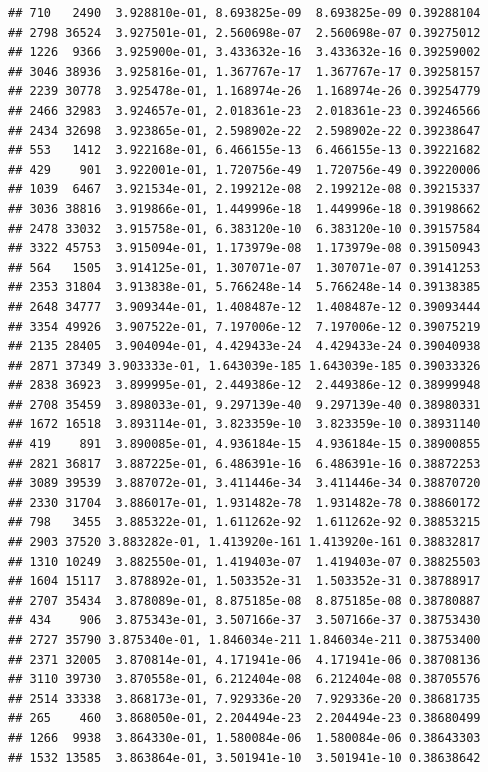 \documentclass[
]{article}
\begin{document}
\begin{verbatim}
## 710   2490  3.928810e-01, 8.693825e-09  8.693825e-09 0.39288104
## 2798 36524  3.927501e-01, 2.560698e-07  2.560698e-07 0.39275012
## 1226  9366  3.925900e-01, 3.433632e-16  3.433632e-16 0.39259002
## 3046 38936  3.925816e-01, 1.367767e-17  1.367767e-17 0.39258157
## 2239 30778  3.925478e-01, 1.168974e-26  1.168974e-26 0.39254779
## 2466 32983  3.924657e-01, 2.018361e-23  2.018361e-23 0.39246566
## 2434 32698  3.923865e-01, 2.598902e-22  2.598902e-22 0.39238647
## 553   1412  3.922168e-01, 6.466155e-13  6.466155e-13 0.39221682
## 429    901  3.922001e-01, 1.720756e-49  1.720756e-49 0.39220006
## 1039  6467  3.921534e-01, 2.199212e-08  2.199212e-08 0.39215337
## 3036 38816  3.919866e-01, 1.449996e-18  1.449996e-18 0.39198662
## 2478 33032  3.915758e-01, 6.383120e-10  6.383120e-10 0.39157584
## 3322 45753  3.915094e-01, 1.173979e-08  1.173979e-08 0.39150943
## 564   1505  3.914125e-01, 1.307071e-07  1.307071e-07 0.39141253
## 2353 31804  3.913838e-01, 5.766248e-14  5.766248e-14 0.39138385
## 2648 34777  3.909344e-01, 1.408487e-12  1.408487e-12 0.39093444
## 3354 49926  3.907522e-01, 7.197006e-12  7.197006e-12 0.39075219
## 2135 28405  3.904094e-01, 4.429433e-24  4.429433e-24 0.39040938
## 2871 37349 3.903333e-01, 1.643039e-185 1.643039e-185 0.39033326
## 2838 36923  3.899995e-01, 2.449386e-12  2.449386e-12 0.38999948
## 2708 35459  3.898033e-01, 9.297139e-40  9.297139e-40 0.38980331
## 1672 16518  3.893114e-01, 3.823359e-10  3.823359e-10 0.38931140
## 419    891  3.890085e-01, 4.936184e-15  4.936184e-15 0.38900855
## 2821 36817  3.887225e-01, 6.486391e-16  6.486391e-16 0.38872253
## 3089 39539  3.887072e-01, 3.411446e-34  3.411446e-34 0.38870720
## 2330 31704  3.886017e-01, 1.931482e-78  1.931482e-78 0.38860172
## 798   3455  3.885322e-01, 1.611262e-92  1.611262e-92 0.38853215
## 2903 37520 3.883282e-01, 1.413920e-161 1.413920e-161 0.38832817
## 1310 10249  3.882550e-01, 1.419403e-07  1.419403e-07 0.38825503
## 1604 15117  3.878892e-01, 1.503352e-31  1.503352e-31 0.38788917
## 2707 35434  3.878089e-01, 8.875185e-08  8.875185e-08 0.38780887
## 434    906  3.875343e-01, 3.507166e-37  3.507166e-37 0.38753430
## 2727 35790 3.875340e-01, 1.846034e-211 1.846034e-211 0.38753400
## 2371 32005  3.870814e-01, 4.171941e-06  4.171941e-06 0.38708136
## 3110 39730  3.870558e-01, 6.212404e-08  6.212404e-08 0.38705576
## 2514 33338  3.868173e-01, 7.929336e-20  7.929336e-20 0.38681735
## 265    460  3.868050e-01, 2.204494e-23  2.204494e-23 0.38680499
## 1266  9938  3.864330e-01, 1.580084e-06  1.580084e-06 0.38643303
## 1532 13585  3.863864e-01, 3.501941e-10  3.501941e-10 0.38638642

\end{verbatim}
\end{document}
